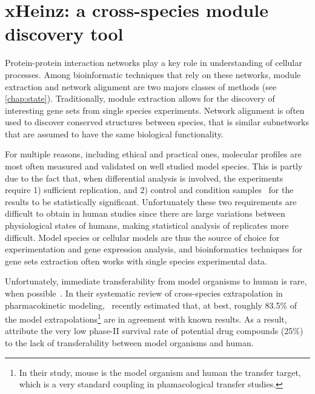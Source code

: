 \chapter{xHeinz: a cross-species module discovery tool}
\label{chap:xheinz}

\label{sec:xhintro}
Protein-protein interaction networks play a key role in understanding of cellular processes.
Among bioinformatic techniques that rely on these networks, module extraction and network alignment are two majors classes of methods (see \cref{chap:state}).
Traditionally, module extraction allows for the discovery of interesting gene sets from single species experiments.
Network alignment is often used to discover conserved structures between species, that is similar subnetworks that are assumed to have the same biological functionality.

For multiple reasons, including ethical and practical ones, molecular profiles are most often measured and validated on well studied model species.
This is partly due to the fact that, when differential analysis is involved, the experiments require 1) sufficient replication, and 2) control and condition samples~\parencite{trapnell2013differential} for the results to be statistically significant.
Unfortunately these two requirements are difficult to obtain in human studies since there are large variations between physiological states of humans, making statistical analysis of replicates more difficult.
Model species or cellular models are thus the source of choice for experimentation and gene expression analysis, and bioinformatics techniques for gene sets extraction often works with single species experimental data.

Unfortunately, immediate transferability from model organisms to human is rare, when possible~\parencite{okyere2014cross}.
In their systematic review of cross-species extrapolation in pharmacokinetic modeling,~\textcite{thiel2015systematic} recently estimated that, at best, roughly 83.5\% of the model extrapolations\footnote{In their study, mouse is the model organism and human the transfer target, which is a very standard coupling in phamacological transfer studies.} are in agreement with known results.
As a result, \Textcite{csermely2013structure} attribute the very low phase-II survival rate of potential drug compounds (25\%) to the lack of transferability between model organisms and human.

